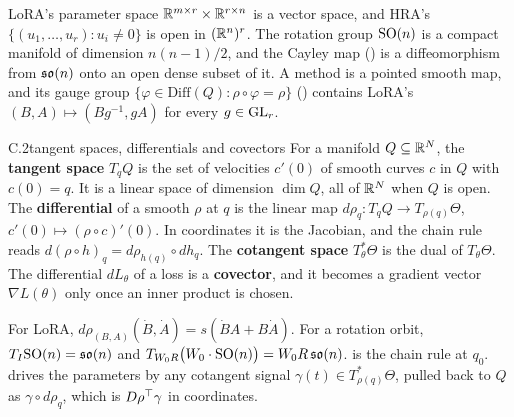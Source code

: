 LoRA's \citep{hu2021lora} parameter space $\mathbb{R}^{m\times r}\times\mathbb{R}^{r\times n}$ is a vector space, and HRA's
\citep{yuan2024bridging} $\{(u_1,\dots,u_r):u_i\ne0\}$ is open in $(\mathbb{R}^n)^r$. The rotation group $\mathrm{SO}(n)$ is a compact
manifold of dimension $n(n-1)/2$, and the Cayley map () is a diffeomorphism from $\mathfrak{so}(n)$ onto an open dense
subset of it. A method is a pointed smooth map, and its gauge group
$\{\varphi\in\mathrm{Diff}(Q):\rho\circ\varphi=\rho\}$ () contains LoRA's $(B,A)\mapsto(Bg^{-1},gA)$ for
every $g\in\mathrm{GL}_r$.


\begin{bgentry}{C.2}{tangent spaces, differentials and covectors}
For a manifold $Q\subseteq\mathbb{R}^N$, the \textbf{tangent space} $T_qQ$ is the set of velocities $c'(0)$ of smooth curves $c$
in $Q$ with $c(0)=q$. It is a linear space of dimension $\dim Q$, all of $\mathbb{R}^N$ when $Q$ is open. The
\textbf{differential} of a smooth $\rho$ at $q$ is the linear map $d\rho_q:T_qQ\to T_{\rho(q)}\Theta$,
$c'(0)\mapsto(\rho\circ c)'(0)$. In coordinates it is the Jacobian, and the chain rule reads $d(\rho\circ
h)_q=d\rho_{h(q)}\circ dh_q$. The \textbf{cotangent space} $T^*_\theta\Theta$ is the dual of $T_\theta\Theta$. The
differential $dL_\theta$ of a loss is a \textbf{covector}, and it becomes a gradient vector $\nabla L(\theta)$ only once
an inner product is chosen.
\end{bgentry}

For LoRA, $d\rho_{(B,A)}(\dot B,\dot A)=s(\dot BA+B\dot A)$. For a rotation orbit, $T_I\mathrm{SO}(n)=\mathfrak{so}(n)$ and
$T_{W_0R}\big(W_0\cdot\mathrm{SO}(n)\big)=W_0R\,\mathfrak{so}(n)$.  is the chain rule at $q_0$.
 drives the parameters by any cotangent signal $\gamma(t)\in T^*_{\rho(q)}\Theta$, pulled back to
$Q$ as $\gamma\circ d\rho_q$, which is $D\rho^{\top}\gamma$ in coordinates.


